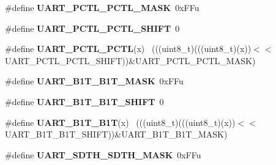 \begin{DoxyCompactItemize}
\item 
\hypertarget{group___u_a_r_t___register___masks_ga0839ffdf12c2ca78a1311c2513bb11de}{}\#define {\bfseries U\+A\+R\+T\+\_\+\+P\+C\+T\+L\+\_\+\+P\+C\+T\+L\+\_\+\+M\+A\+S\+K}~0x\+F\+Fu\label{group___u_a_r_t___register___masks_ga0839ffdf12c2ca78a1311c2513bb11de}

\item 
\hypertarget{group___u_a_r_t___register___masks_ga5486eb065bb1da8d17422ed54bfccc20}{}\#define {\bfseries U\+A\+R\+T\+\_\+\+P\+C\+T\+L\+\_\+\+P\+C\+T\+L\+\_\+\+S\+H\+I\+F\+T}~0\label{group___u_a_r_t___register___masks_ga5486eb065bb1da8d17422ed54bfccc20}

\item 
\hypertarget{group___u_a_r_t___register___masks_gae2e29dc05280d4a86cff010c56048a9e}{}\#define {\bfseries U\+A\+R\+T\+\_\+\+P\+C\+T\+L\+\_\+\+P\+C\+T\+L}(x)                                            ~(((uint8\+\_\+t)(((uint8\+\_\+t)(x))$<$$<$U\+A\+R\+T\+\_\+\+P\+C\+T\+L\+\_\+\+P\+C\+T\+L\+\_\+\+S\+H\+I\+F\+T))\&U\+A\+R\+T\+\_\+\+P\+C\+T\+L\+\_\+\+P\+C\+T\+L\+\_\+\+M\+A\+S\+K)\label{group___u_a_r_t___register___masks_gae2e29dc05280d4a86cff010c56048a9e}

\item 
\hypertarget{group___u_a_r_t___register___masks_gae4a52d2d3d1c6c2eb3a70638f5ae3777}{}\#define {\bfseries U\+A\+R\+T\+\_\+\+B1\+T\+\_\+\+B1\+T\+\_\+\+M\+A\+S\+K}~0x\+F\+Fu\label{group___u_a_r_t___register___masks_gae4a52d2d3d1c6c2eb3a70638f5ae3777}

\item 
\hypertarget{group___u_a_r_t___register___masks_gaa963f2ddaff44630e92078d1a2e0969c}{}\#define {\bfseries U\+A\+R\+T\+\_\+\+B1\+T\+\_\+\+B1\+T\+\_\+\+S\+H\+I\+F\+T}~0\label{group___u_a_r_t___register___masks_gaa963f2ddaff44630e92078d1a2e0969c}

\item 
\hypertarget{group___u_a_r_t___register___masks_ga6df0efeae5c472db7d3e3b6bcd8fdf0a}{}\#define {\bfseries U\+A\+R\+T\+\_\+\+B1\+T\+\_\+\+B1\+T}(x)                                                ~(((uint8\+\_\+t)(((uint8\+\_\+t)(x))$<$$<$U\+A\+R\+T\+\_\+\+B1\+T\+\_\+\+B1\+T\+\_\+\+S\+H\+I\+F\+T))\&U\+A\+R\+T\+\_\+\+B1\+T\+\_\+\+B1\+T\+\_\+\+M\+A\+S\+K)\label{group___u_a_r_t___register___masks_ga6df0efeae5c472db7d3e3b6bcd8fdf0a}

\item 
\hypertarget{group___u_a_r_t___register___masks_gad484627a8e70e0f61a641675dc45ced3}{}\#define {\bfseries U\+A\+R\+T\+\_\+\+S\+D\+T\+H\+\_\+\+S\+D\+T\+H\+\_\+\+M\+A\+S\+K}~0x\+F\+Fu\label{group___u_a_r_t___register___masks_gad484627a8e70e0f61a641675dc45ced3}


\end{DoxyCompactItemize}
